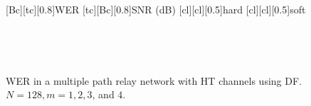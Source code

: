\begin{figure}
    [Bc][tc][0.8]{WER}
    [tc][Bc][0.8]{SNR (dB)}
    [cl][cl][0.5]{hard}
    [cl][cl][0.5]{soft}

\centerline{
	 \\
}
\centerline{
	 \\
}
\caption{WER in a multiple path relay network with HT channels using DF.  $N = 128, m = 1, 2, 3$, and $4$.}
\label{fig:mp_df_wer_plots_HT}
\end{figure}

